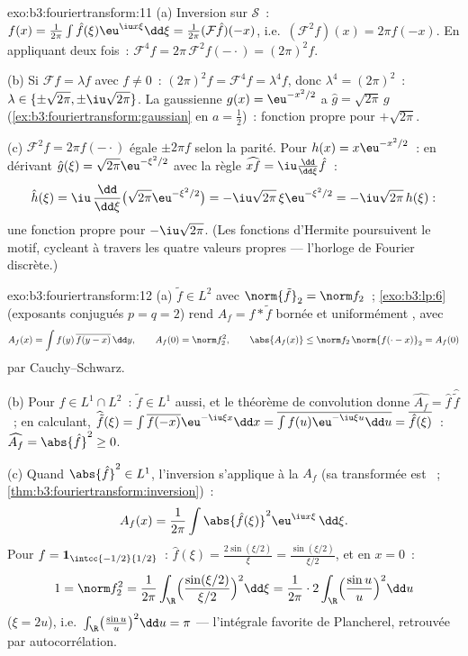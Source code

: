 \begin{solution}{exo:b3:fouriertransform:11}
(a) Inversion sur $\mathcal S$~: $f(x) =
\frac1{2\pi}\int\hat f(\xi)\eu^{\iu x\xi}\dd\xi =
\frac1{2\pi}(\mathcal F\hat f)(-x)$, i.e.\ $(\mathcal
F^2f)(x) = 2\pi f(-x)$. En appliquant deux fois~: $\mathcal
F^4f = 2\pi\,\mathcal F^2f(-\cdot) = (2\pi)^2f$.

(b) Si $\mathcal Ff = \lambda f$ avec $f \neq 0$~:
$(2\pi)^2f = \mathcal F^4f = \lambda^4f$, donc $\lambda^4 =
(2\pi)^2$~: $\lambda \in \{\pm\sqrt{2\pi},
\pm\iu\sqrt{2\pi}\}$. La gaussienne $g(x) = \eu^{-x^2/2}$ a
$\hat g = \sqrt{2\pi}\,g$
(\cref{ex:b3:fouriertransform:gaussian} en $a = \frac12$)~:
fonction propre pour $+\sqrt{2\pi}$.

(c) $\mathcal F^2f = 2\pi f(-\cdot)$ égale $\pm2\pi f$ selon
la parité. Pour $h(x) = x\eu^{-x^2/2}$~: en dérivant $\hat
g(\xi) = \sqrt{2\pi}\eu^{-\xi^2/2}$ avec la règle
$\widehat{xf} = \iu\frac{\dd}{\dd\xi}\hat f$~:
\[
\hat h(\xi) = \iu\,\frac{\dd}{\dd\xi}\bigl(\sqrt{2\pi}
\eu^{-\xi^2/2}\bigr) = -\iu\sqrt{2\pi}\,\xi\eu^{-\xi^2/2}
= -\iu\sqrt{2\pi}\,h(\xi) :
\]
une fonction propre pour $-\iu\sqrt{2\pi}$. (Les fonctions
d'Hermite poursuivent le motif, cycleant à travers les quatre
valeurs propres --- l'horloge de Fourier discrète.)

\end{solution}

\begin{solution}{exo:b3:fouriertransform:12}
(a) $\tilde f \in L^2$ avec $\norm{\tilde f}_2 = \norm f_2$~;
\cref{exo:b3:lp:6} (exposants conjugués $p = q = 2$) rend
$A_f = f * \tilde f$ bornée et uniformément , avec
\[
A_f(x) = \int f(y)\,\overline{f(y - x)}\,\dd y,
\qquad A_f(0) = \norm f_2^2,
\qquad \abs{A_f(x)} \leq \norm f_2\,\norm{f(\cdot -
x)}_2 = A_f(0)
\]
par Cauchy--Schwarz.

(b) Pour $f \in L^1\cap L^2$~: $\tilde f \in L^1$ aussi, et le
théorème de convolution donne $\widehat{A_f} = \hat f\,
\widehat{\tilde f}$~; en calculant, $\widehat{\tilde f}(\xi)
= \int\overline{f(-x)}\eu^{-\iu\xi x}\dd x =
\overline{\int f(u)\eu^{-\iu\xi u}\dd u} =
\overline{\hat f(\xi)}$~: $\widehat{A_f} = \abs{\hat f}^2
\geq 0$.

(c) Quand $\abs{\hat f}^2 \in L^1$, l'inversion s'applique à
la  $A_f$ (sa transformée est ~;
\cref{thm:b3:fouriertransform:inversion})~:
\[
A_f(x) = \frac1{2\pi}\int\abs{\hat f(\xi)}^2
\eu^{\iu x\xi}\,\dd\xi .
\]
Pour $f = \mathbf 1_{\intcc{-1/2}{1/2}}$~: $\hat f(\xi) =
\frac{2\sin(\xi/2)}\xi = \frac{\sin(\xi/2)}{\xi/2}$, et en
$x = 0$~:
\[
1 = \norm f_2^2 = \frac1{2\pi}\int_\R
\Bigl(\frac{\sin(\xi/2)}{\xi/2}\Bigr)^2\dd\xi
= \frac1{2\pi}\cdot2\int_\R\Bigl(\frac{\sin u}u\Bigr)^2\dd u
\]
($\xi = 2u$), i.e.\ $\int_\R\bigl(\frac{\sin u}u\bigr)^2\dd
u = \pi$ --- l'intégrale favorite de Plancherel, retrouvée
par autocorrélation.
\end{solution}

